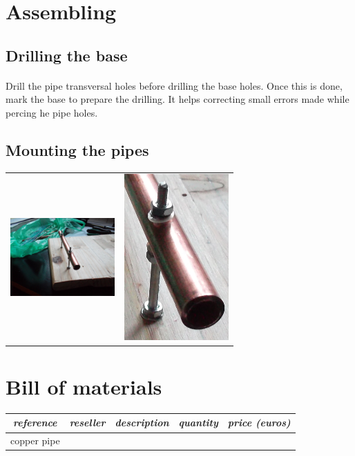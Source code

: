 \documentclass[12pt]{article}
\begin{document}
\newpage
\section{Assembling}

\subsection{Drilling the base}
\paragraph{} Drill the pipe transversal holes before drilling the base holes. Once this is
done, mark the base to prepare the drilling. It helps correcting small errors made while
percing  he pipe holes.

\subsection{Mounting the pipes}
\begin{center}
  \begin{tabular}{c|c}
    \includegraphics[keepaspectratio=true, width=40mm]{../pics/assembly/mounted_pipe_scaled.jpg} &
    \includegraphics[keepaspectratio=true, width=40mm]{../pics/assembly/mounted_pipe_cropped.jpg}
  \end{tabular}
\end{center}

\newpage
\section{Bill of materials}
\begin{center}
  \begin{tabular}{|c|c|c|c|c|}
    \hline
    \textit{reference} &
    \textit{reseller} &
    \textit{description} &
    \textit{quantity} &
    \textit{price (euros)}\\
    \hline
    copper pipe\\
    \hline
  \end{tabular}
\end{center}
\end{document}
